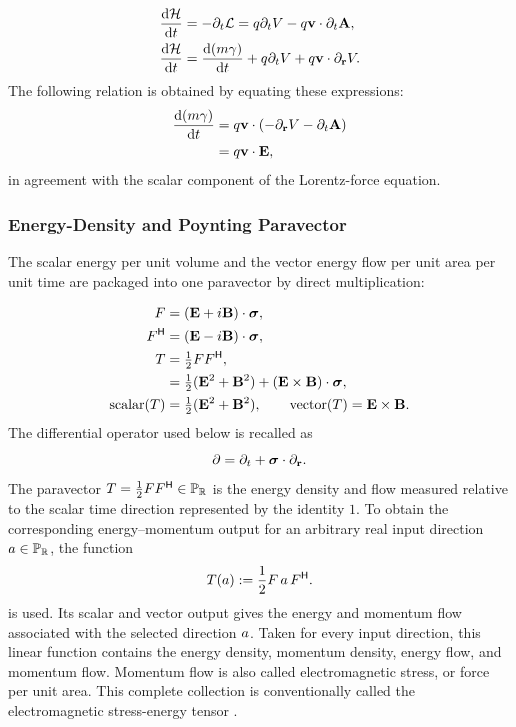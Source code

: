 \begin{align*}
\frac{\mathrm d\mathcal H}{\mathrm d t}
&=-\partial_t\mathcal L
=q\partial_tV-q\mathbf{v}\cdot\partial_t\mathbf{A},\\
\frac{\mathrm d\mathcal H}{\mathrm d t}
&=\frac{\mathrm d(m\gamma)}{\mathrm d t}
+q\partial_tV+q\mathbf{v}\cdot\partial_{\mathbf{r}} V.
\end{align*}
The following relation is obtained by equating these expressions:
\begin{align*}
\frac{\mathrm d(m\gamma)}{\mathrm d t}
&=q\mathbf{v}\cdot(-\partial_{\mathbf{r}} V-\partial_t\mathbf{A})\notag\\
&=q\mathbf{v}\cdot\mathbf{E},
\end{align*}
in agreement with the scalar component of the Lorentz-force equation.

\subsubsection{Energy-Density and Poynting Paravector}
The scalar energy per unit volume and the vector energy flow per unit area
per unit time are packaged into one paravector by direct multiplication:

\begin{align*}
F &= (\mathbf{E} + i \mathbf{B}) \cdot \mathbf{\bm{\sigma}},\notag \\
F^{\mathsf H} &= (\mathbf{E} - i \mathbf{B}) \cdot \mathbf{\bm{\sigma}},\notag \\
T &= \tfrac{1}{2} FF^{\mathsf H},\notag \\
&= \tfrac{1}{2} (\mathbf{E}^{2} + \mathbf{B}^{2})
+ (\mathbf{E} \times \mathbf{B}) \cdot \mathbf{\bm{\sigma}},\\
\operatorname{scalar}(T)&=\tfrac12(\mathbf{E}^2+\mathbf{B}^2),\qquad
\operatorname{vector}(T)=\mathbf{E}\times\mathbf{B}.
\end{align*}
The differential operator used below is recalled as
\begin{equation*}
\partial = \partial _{t} + \mathbf{\bm{\sigma}} \cdot \partial_{\mathbf{r}}.
\end{equation*}
The paravector
\(T=\tfrac12FF^{\mathsf H}\in\mathbb{P}_{\mathbb{R}}\) is the energy density and
flow measured relative to the scalar time direction represented by the
identity \(1\). To obtain the corresponding energy--momentum output for an
arbitrary real input direction \(a\in\mathbb{P}_{\mathbb{R}}\), the function
\begin{equation}
T(a)
:=\frac12F\,a\,F^{\mathsf H}.
\label{eq:stress-energy-map}
\end{equation}
is used. Its scalar and vector output gives the energy and momentum flow
associated with the selected direction \(a\). Taken for every input
direction, this linear function contains the energy density, momentum
density, energy flow, and momentum flow. Momentum flow is also called
electromagnetic stress, or force per unit area. This complete collection is
conventionally called the electromagnetic stress-energy tensor
\cite{hestenes1966,jackson1998,doran2003}.

